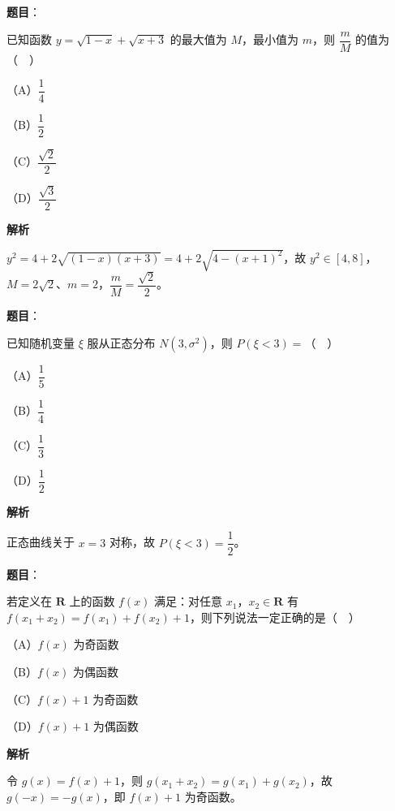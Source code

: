 \begin{answer}

\textbf{题目}：

已知函数 $y=\sqrt{1-x}+\sqrt{x+3}$ 的最大值为 $M$，最小值为 $m$，则 $\dfrac mM$ 的值为（　）

（A）$\dfrac14$

（B）$\dfrac12$

（C）$\dfrac{\sqrt2}2$

（D）$\dfrac{\sqrt3}2$

\textbf{解析}

$y^2=4+2\sqrt{(1-x)(x+3)}=4+2\sqrt{4-(x+1)^2}$，故 $y^2\in[4,8]$，$M=2\sqrt2$、$m=2$，$\dfrac mM=\dfrac{\sqrt2}2$。


\end{answer}
\begin{answer}

\textbf{题目}：

已知随机变量 $\xi$ 服从正态分布 $N(3,\sigma^2)$，则 $P(\xi<3)=$（　）

（A）$\dfrac15$

（B）$\dfrac14$

（C）$\dfrac13$

（D）$\dfrac12$

\textbf{解析}

正态曲线关于 $x=3$ 对称，故 $P(\xi<3)=\dfrac12$。


\end{answer}
\begin{answer}

\textbf{题目}：

若定义在 $\mathbf R$ 上的函数 $f(x)$ 满足：对任意 $x_1$，$x_2\in\mathbf R$ 有 $f(x_1+x_2)=f(x_1)+f(x_2)+1$，则下列说法一定正确的是（　）

（A）$f(x)$ 为奇函数

（B）$f(x)$ 为偶函数

（C）$f(x)+1$ 为奇函数

（D）$f(x)+1$ 为偶函数

\textbf{解析}

令 $g(x)=f(x)+1$，则 $g(x_1+x_2)=g(x_1)+g(x_2)$，故 $g(-x)=-g(x)$，即 $f(x)+1$ 为奇函数。


\end{answer}
